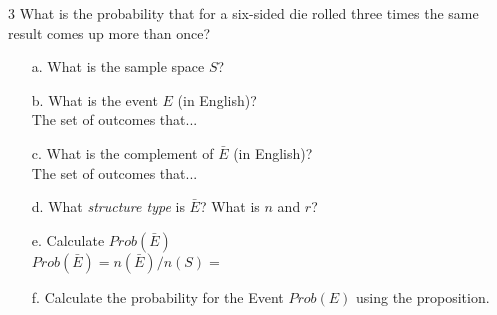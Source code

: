 \documentclass[a4paper,12pt]{book}
\newcounter{question}
\begin{document}
        
        \begin{question}{\thequestion}{3}
            What is the probability that for a six-sided die rolled
            three times the same result comes up more than once?
            
            \begin{enumerate}
                \item[a.] What is the sample space $S$?
                
                \item[b.] What is the event $E$ (in English)? ~\\
                    The set of outcomes that... 
                    
                \item[c.] What is the complement of $\bar{E}$ (in English)? ~\\
                    The set of outcomes that... 
                
                \item[d.] What \textit{structure type} is $\bar{E}$? What is $n$ and $r$? ~\\
                
                \item[e.] Calculate $Prob(\bar{E})$ ~\\
                    $Prob(\bar{E}) = n(\bar{E}) / n(S) =$
                
                \item[f.] Calculate the probability for the Event $Prob(E)$ using the proposition. ~\\
            \end{enumerate}
        \end{question}
\end{document}
